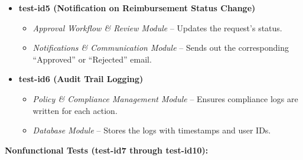 \documentclass[12pt, titlepage]{article}
\begin{document}
\begin{itemize}
  \item \textbf{test-id5 (Notification on Reimbursement Status Change)}
    \begin{itemize}
      \item \emph{Approval Workflow \& Review Module} – Updates the request’s status.
      \item \emph{Notifications \& Communication Module} – Sends out the corresponding “Approved” or “Rejected” email.
    \end{itemize}

  \item \textbf{test-id6 (Audit Trail Logging)}
    \begin{itemize}
      \item \emph{Policy \& Compliance Management Module} – Ensures compliance logs are written for each action.
      \item \emph{Database Module} – Stores the logs with timestamps and user IDs.
    \end{itemize}
\end{itemize}

\textbf{Nonfunctional Tests (test-id7 through test-id10):}
\end{document}
